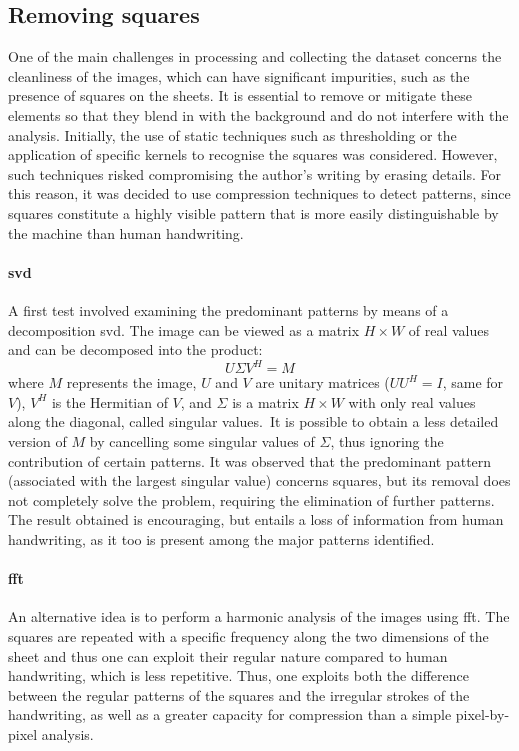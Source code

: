 \subsection{Removing squares}
    One of the main challenges in processing and collecting the dataset concerns the cleanliness of the images, which can have significant impurities, such as the presence of squares on the sheets. It is essential to remove or mitigate these elements so that they blend in with the background and do not interfere with the analysis. Initially, the use of static techniques such as thresholding or the application of specific kernels to recognise the squares was considered. However, such techniques risked compromising the author's writing by erasing details. For this reason, it was decided to use compression techniques to detect patterns, since squares constitute a highly visible pattern that is more easily distinguishable by the machine than human handwriting.

    \paragraph{\gls{svd}}
    A first test involved examining the predominant patterns by means of a decomposition \gls{svd}. The image can be viewed as a matrix $H \times W$ of real values and can be decomposed into the product:
    \[
    	U\Sigma V^H = M
    \]
    where $M$ represents the image, $U$ and $V$ are unitary matrices ($UU^H = I$, same for $V$), $V^H$ is the Hermitian of $V$, and $\Sigma$ is a matrix $H \times W$ with only real values along the diagonal, called singular values.\
    It is possible to obtain a less detailed version of $M$ by cancelling some singular values of $\Sigma$, thus ignoring the contribution of certain patterns. It was observed that the predominant pattern (associated with the largest singular value) concerns squares, but its removal does not completely solve the problem, requiring the elimination of further patterns. The result obtained is encouraging, but entails a loss of information from human handwriting, as it too is present among the major patterns identified.

    \paragraph{\gls{fft}}
    An alternative idea is to perform a harmonic analysis of the images using \gls{fft}. The squares are repeated with a specific frequency along the two dimensions of the sheet and thus one can exploit their regular nature compared to human handwriting, which is less repetitive. Thus, one exploits both the difference between the regular patterns of the squares and the irregular strokes of the handwriting, as well as a greater capacity for compression than a simple pixel-by-pixel analysis.

